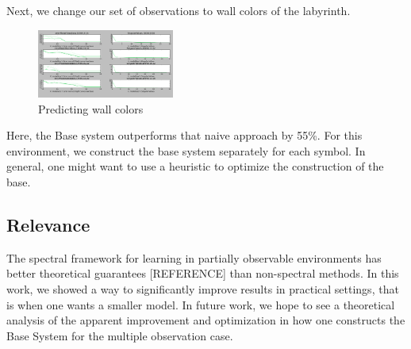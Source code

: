 \documentclass{acm_proc_article-sp}
\begin{document}
Next, we change our set of observations to wall colors of the labyrinth. 

\begin{figure}[ht!]
\centering
\includegraphics[width=45mm]{lucasplots/MO.png}
\caption{Predicting wall colors \label{overflow}}
\end{figure}

Here, the Base system outperforms that naive approach by 55\%. For this environment, we construct the base system separately for each symbol. In general, one might want to use a heuristic to optimize the construction of the base.

\subsection{Relevance}
The spectral framework for learning in partially observable environments has better theoretical guarantees [REFERENCE] than non-spectral methods. In this work, we showed a way to significantly improve results in practical settings, that is when one wants a smaller model. In future work, we hope to see a theoretical analysis of the apparent improvement and optimization in how one constructs the Base System for the multiple observation case. 

%

%
%
\appendix
\end{document}
